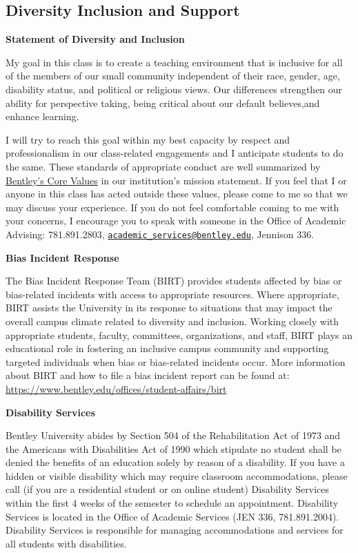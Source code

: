\documentclass[
]{book}
\begin{document}
\hypertarget{diversity-inclusion-and-support}{%
\subsection*{Diversity Inclusion and Support}\label{diversity-inclusion-and-support}}

\textbf{Statement of Diversity and Inclusion}

My goal in this class is to create a teaching environment that is inclusive for all of the members of our small community independent of their race, gender, age, disability status, and political or religious views. Our differences strengthen our ability for perspective taking, being critical about our default believes,and enhance learning.

I will try to reach this goal within my best capacity by respect and professionalism in our class-related engagements and I anticipate students to do the same. These standards of appropriate conduct are well summarized by \href{https://www.bentley.edu/about/mission-and-values}{Bentley's Core Values} in our institution's mission statement. If you feel that I or anyone in this class has acted outside these values, please come to me so that we may discuss your experience. If you do not feel comfortable coming to me with your concerns, I encourage you to speak with someone in the Office of Academic Advising: 781.891.2803, \href{mailto:academic_services@bentley.edu}{\nolinkurl{academic\_services@bentley.edu}}, Jennison 336.

\textbf{Bias Incident Response}

The Bias Incident Response Team (BIRT) provides students affected by bias or bias-related incidents with access to appropriate resources. Where appropriate, BIRT assists the University in its response to situations that may impact the overall campus climate related to diversity and inclusion. Working closely with appropriate students, faculty, committees, organizations, and staff, BIRT plays an educational role in fostering an inclusive campus community and supporting targeted individuals when bias or bias-related incidents occur. More information about BIRT and how to file a bias incident report can be found at: \url{https://www.bentley.edu/offices/student-affairs/birt}

\textbf{Disability Services}

Bentley University abides by Section 504 of the Rehabilitation Act of 1973 and the Americans with Disabilities Act of 1990 which stipulate no student shall be denied the benefits of an education solely by reason of a disability. If you have a hidden or visible disability which may require classroom accommodations, please call (if you are a residential student or on online student) Disability Services within the first 4 weeks of the semester to schedule an appointment. Disability Services is located in the Office of Academic Services (JEN 336, 781.891.2004). Disability Services is responsible for managing accommodations and services for all students with disabilities.
\end{document}
